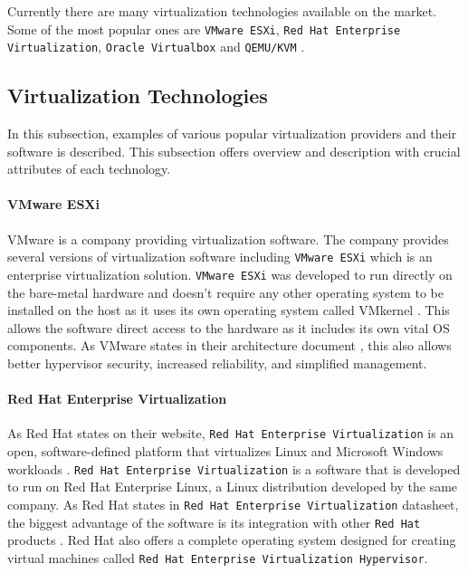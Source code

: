Currently there are many virtualization technologies available on the market. Some of the most popular ones are \texttt{VMware ESXi}, \texttt{Red Hat Enterprise Virtualization}, \texttt{Oracle Virtualbox} and \texttt{QEMU/KVM} \cite{virtualizationpopular}.\\
\subsection{Virtualization Technologies}
In this subsection, examples of various popular virtualization providers and their software is described. This subsection offers overview and description with crucial attributes of each technology.
\paragraph{VMware ESXi}
VMware is a company providing virtualization software. The company provides several versions of virtualization software including \texttt{VMware ESXi} which is an enterprise virtualization solution. \texttt{VMware ESXi} was developed to run directly on the bare-metal hardware and doesn't require any other operating system to be installed on the host as it uses its own operating system called VMkernel \cite{vmwarearch}. This allows the software direct access to the hardware as it includes its own vital OS components. As VMware states in their architecture document \cite{vmwarearch}, this also allows better hypervisor security, increased reliability,
and simplified management. 
\paragraph{Red Hat Enterprise Virtualization}
As Red Hat states on their website, \texttt{Red Hat Enterprise Virtualization} is an open, software-defined platform that virtualizes Linux and Microsoft Windows workloads \cite{rhev}. \texttt{Red Hat Enterprise Virtualization} is a software that is developed to run on Red Hat Enterprise Linux, a Linux distribution developed by the same company. As Red Hat states in \texttt{Red Hat Enterprise Virtualization} datasheet, the biggest advantage of the software is its integration with other \texttt{Red Hat} products \cite{rhdatasheet}. Red Hat also offers a complete operating system designed for creating virtual machines called \texttt{Red Hat Enterprise Virtualization Hypervisor}.
